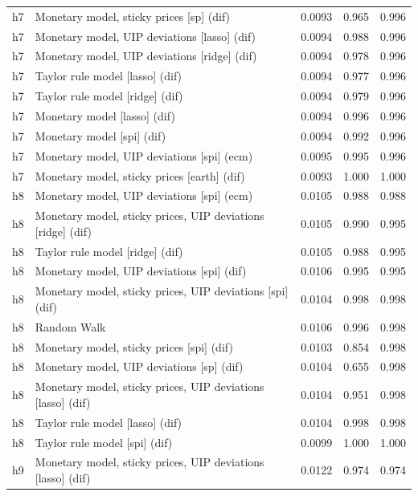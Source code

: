 \begin{ThreePartTable}
\begin{longtable}[t]{cp{5.5cm}ccc}
h7 & \raggedright Monetary model, sticky prices [sp] (dif) & 0.0093 & 0.965 & 0.996\\
h7 & \raggedright Monetary model, UIP deviations [lasso] (dif) & 0.0094 & 0.988 & 0.996\\
h7 & \raggedright Monetary model, UIP deviations [ridge] (dif) & 0.0094 & 0.978 & 0.996\\
h7 & \raggedright Taylor rule model [lasso] (dif) & 0.0094 & 0.977 & 0.996\\
h7 & \raggedright Taylor rule model [ridge] (dif) & 0.0094 & 0.979 & 0.996\\
h7 & \raggedright Monetary model [lasso] (dif) & 0.0094 & 0.996 & 0.996\\
h7 & \raggedright Monetary model [spi] (dif) & 0.0094 & 0.992 & 0.996\\
h7 & \raggedright Monetary model, UIP deviations [spi] (ecm) & 0.0095 & 0.995 & 0.996\\
h7 & \raggedright Monetary model, sticky prices [earth] (dif) & 0.0093 & 1.000 & 1.000\\
\addlinespace
h8 & \raggedright Monetary model, UIP deviations [spi] (ecm) & 0.0105 & 0.988 & 0.988\\
h8 & \raggedright Monetary model, sticky prices, UIP deviations [ridge] (dif) & 0.0105 & 0.990 & 0.995\\
h8 & \raggedright Taylor rule model [ridge] (dif) & 0.0105 & 0.988 & 0.995\\
h8 & \raggedright Monetary model, UIP deviations [spi] (dif) & 0.0106 & 0.995 & 0.995\\
h8 & \raggedright Monetary model, sticky prices, UIP deviations [spi] (dif) & 0.0104 & 0.998 & 0.998\\
h8 & \raggedright Random Walk & 0.0106 & 0.996 & 0.998\\
h8 & \raggedright Monetary model, sticky prices [spi] (dif) & 0.0103 & 0.854 & 0.998\\
h8 & \raggedright Monetary model, UIP deviations [sp] (dif) & 0.0104 & 0.655 & 0.998\\
h8 & \raggedright Monetary model, sticky prices, UIP deviations [lasso] (dif) & 0.0104 & 0.951 & 0.998\\
h8 & \raggedright Taylor rule model [lasso] (dif) & 0.0104 & 0.998 & 0.998\\
h8 & \raggedright Taylor rule model [spi] (dif) & 0.0099 & 1.000 & 1.000\\
\addlinespace
h9 & \raggedright Monetary model, sticky prices, UIP deviations [lasso] (dif) & 0.0122 & 0.974 & 0.974\\

\end{longtable}
\end{ThreePartTable}
